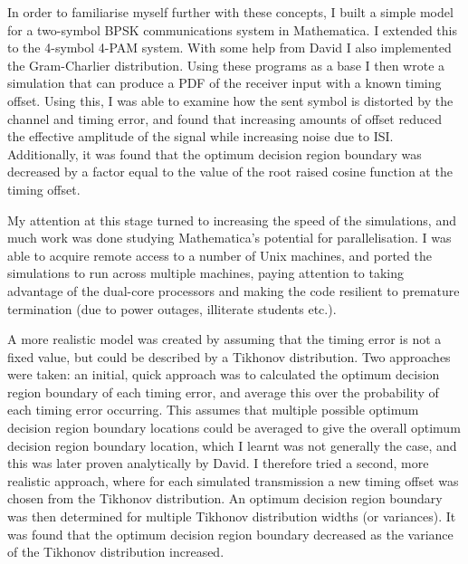 In order to familiarise myself further with these concepts, I built a
simple model for a two-symbol BPSK communications system in Mathematica.
I extended this to the 4-symbol 4-PAM system. With some help from David I also
implemented the Gram-Charlier distribution. Using these programs as a
base I then wrote a simulation that can produce a PDF of the receiver input
with a known timing offset. Using this, I was able to examine how the
sent symbol is distorted by the channel and timing error, and found that
increasing amounts of offset reduced the effective amplitude of the
signal while increasing noise due to ISI. Additionally, it was found
that the optimum decision region boundary was decreased by a factor
equal to the value of the root raised cosine function at the timing
offset.

My attention at this stage turned to increasing the speed of the
simulations, and much work was done studying Mathematica's potential for
parallelisation. I was able to acquire remote access to a number of Unix
machines, and ported the simulations to run across multiple machines,
paying attention to taking advantage of the dual-core processors and
making the code resilient to premature termination (due to power outages,
illiterate students etc.).

A more realistic model was created by assuming that the timing error is
not a fixed value, but could be described by a Tikhonov distribution.
Two approaches were taken: an initial, quick approach was to calculated
the optimum decision region boundary of each timing error, and average
this over the probability of each timing error occurring. This assumes
that multiple possible optimum decision region boundary locations could
be averaged to give the overall optimum decision region boundary
location, which I learnt was not generally the case, and this was later
proven analytically by David. I therefore tried a second, more realistic
approach, where for each simulated transmission a new timing offset was
chosen from the Tikhonov distribution. An optimum decision region
boundary was then determined for multiple Tikhonov distribution widths
(or variances). It was found that the optimum decision region boundary
decreased as the variance of the Tikhonov distribution increased.

